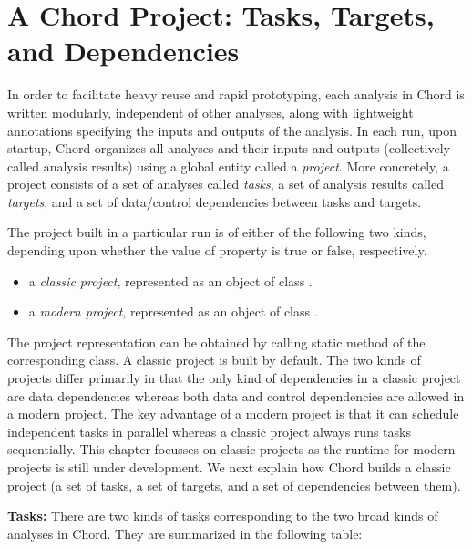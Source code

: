 \chapter{A Chord Project: Tasks, Targets, and Dependencies}
\label{chap:project}

In order to facilitate heavy reuse and rapid prototyping, each analysis in Chord is
written modularly, independent of other analyses, along with lightweight annotations
specifying the inputs and outputs of the analysis.
In each run, upon startup, Chord organizes all analyses and their inputs and outputs
(collectively called analysis results) using a global entity
called a {\it project}.  More concretely, a project consists of a set of
analyses called {\it tasks}, a set of analysis results called {\it targets}, and
a set of data/control dependencies between tasks and targets.

The project built in a particular run is of either of the following two kinds,
depending upon whether the value of property  is true or false, respectively.
\begin{itemize}
\item
a {\it classic project}, represented as an object of
class .
\item
a {\it modern project}, represented as an object of
class .
\end{itemize}
The project representation can be obtained by calling static method  of the
corresponding class.
A classic project is built by default.
The two kinds of projects differ
primarily in that the only kind of dependencies in a classic
project are data dependencies whereas both data and control dependencies are
allowed in a modern project.  The key advantage of a modern project is that it
can schedule independent tasks in parallel whereas a classic project always
runs tasks sequentially.  This chapter focusses on classic projects as the
runtime for modern projects is still under development.
We next explain how Chord builds a classic project
(a set of tasks, a set of targets, and a set of dependencies between them).

{\bf Tasks:}
There are two kinds of tasks corresponding to the two broad kinds of analyses in Chord.
They are summarized in the following table:

